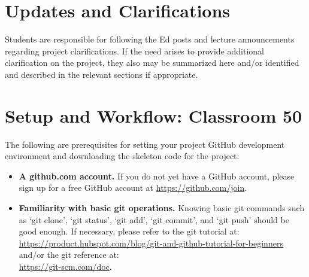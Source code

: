 \documentclass[letterpaper,11pt]{article}
\begin{document}




\section{Updates and Clarifications}
\label{sec:updates}

Students are responsible for following the Ed posts and lecture announcements
regarding project clarifications. If the need arises to provide additional
clarification on the project, they also may be summarized here and/or identified
and described in the relevant sections if appropriate.


\appendix
\section{Setup and Workflow: Classroom 50}
\label{sec:appx:setup}


The following are prerequisites for setting your project GitHub development
environment and downloading the skeleton code for the project:

\begin{itemize}

\item \textbf{A github.com account.}
					If you do not yet have a GitHub account,
					please sign up for a free GitHub account at \url{https://github.com/join}.


\item \textbf{Familiarity with basic git operations.}
					Knowing basic git commands such as `git clone', `git status', `git add',
					`git commit', and `git push' should be good enough. If necessary,
					please refer to the git tutorial at:\\
          \url{https://product.hubspot.com/blog/git-and-github-tutorial-for-beginners}\\
          and/or the git reference at:\\
          \url{https://git-scm.com/doc}.


\end{itemize}
\end{document}

